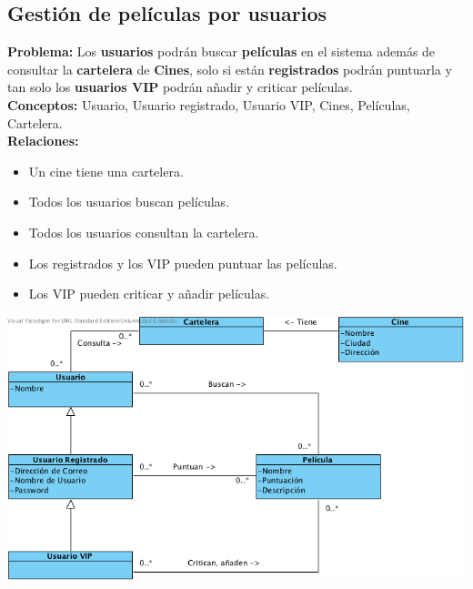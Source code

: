 \documentclass{article}
\begin{document}
	\subsection*{Gestión de películas por usuarios}
	\textbf{Problema:} Los \textbf{usuarios} podrán buscar \textbf{películas} en el sistema además de consultar la \textbf{cartelera} de \textbf{Cines}, solo si están \textbf{registrados} podrán puntuarla y tan solo los \textbf{usuarios VIP} podrán añadir y criticar películas.\\
	\textbf{Conceptos:} Usuario, Usuario registrado, Usuario VIP, Cines, Películas, Cartelera.\\
\textbf{	Relaciones:}
		\begin{itemize}
			\item Un cine tiene una cartelera.
			\item Todos los usuarios buscan películas.
			\item Todos los usuarios consultan la cartelera.
			\item Los registrados y los VIP pueden puntuar las películas.
			\item Los VIP pueden criticar y añadir películas.		
		\end{itemize}
			\includegraphics[width=1\linewidth]{./C-PeliculasUsuarios}
\end{document}
